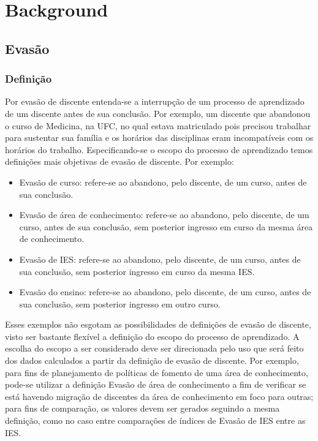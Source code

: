 \documentclass{report}
\begin{document}
\listoftodos

\tableofcontents

\chapter{Background}

\section{Evasão}
\cite{esclarecimentos_calculos}
\cite{mudanca_calculos}

\subsection{Definição}
Por evasão de discente entenda-se a interrupção de um processo de aprendizado de um discente antes de sua conclusão. Por exemplo, um discente que abandonou o curso de Medicina, na UFC, no qual estava matriculado pois precisou trabalhar para sustentar sua família e os horários das disciplinas eram incompatíveis com os horários do trabalho. Especificando-se o escopo do processo de aprendizado temos definições mais objetivas de evasão de discente. Por exemplo:
\begin{itemize}
\item Evasão de curso: refere-se ao abandono, pelo discente, de um curso, antes de sua conclusão.
\item Evasão de área de conhecimento: refere-se ao abandono, pelo discente, de um curso, antes de sua conclusão, sem posterior ingresso em curso da mesma área de conhecimento.
\item Evasão de IES: refere-se ao abandono, pelo discente, de um curso, antes de sua conclusão, sem posterior ingresso em curso da mesma IES. 
\item Evasão do ensino: refere-se ao abandono, pelo discente, de um curso, antes de sua conclusão, sem posterior ingresso em outro curso.
\end{itemize}

Esses exemplos não esgotam as possibilidades de definições de evasão de discente, visto ser bastante flexível a definição do escopo do processo de aprendizado. A escolha do escopo a ser considerado deve ser direcionada pelo uso que será feito dos dados calculados a partir da definição de evasão de discente. Por exemplo, para fins de planejamento de políticas de fomento de uma área de conhecimento, pode-se utilizar a definição Evasão de área de conhecimento a fim de verificar se está havendo migração de discentes da área de conhecimento em foco para outras; para fins de comparação, os valores devem ser gerados seguindo a mesma definição, como no caso entre comparações de índices de Evasão de IES entre as IES.
\end{document}
